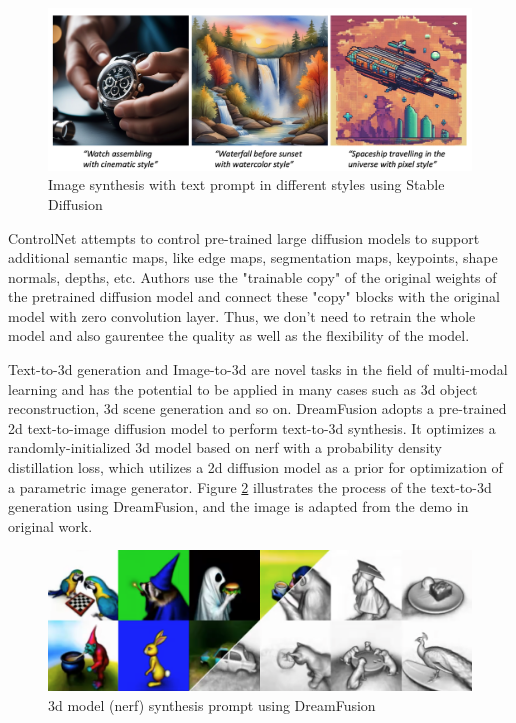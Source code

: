 \documentclass[12pt,DIV14,BCOR12mm,a4paper,footinclude=false,headinclude,parskip=half-,twoside,openright,cleardoublepage=empty,toc=index,bibliography=totoc,listof=totoc]{scrreprt}
\numberwithin{equation}{chapter}
\begin{document}
\begin{figure}[h]
	\centering
	\includegraphics[scale=0.217]{img/sd.png}
	\caption{Image synthesis with text prompt in different styles using Stable Diffusion}
	\label{img:sd}
\end{figure}

ControlNet\cite{zhang2023adding} attempts to control pre-trained large diffusion models to support additional semantic maps, like edge maps, segmentation maps, keypoints, shape normals, depths, etc. Authors use the "trainable copy" of the original weights of the pretrained diffusion model and connect these "copy" blocks with the original model with zero convolution layer. Thus, we don't need to retrain the whole model and also gaurentee the quality as well as the flexibility of the model.

Text-to-\gls{3d} generation and Image-to-\gls{3d} are novel tasks in the field of multi-modal learning and has the potential to be applied in many cases such as \gls{3d} object reconstruction, \gls{3d} scene generation and so on. DreamFusion\cite{poole2022dreamfusion} adopts a pre-trained \gls{2d} text-to-image diffusion model to perform text-to-\gls{3d} synthesis. It optimizes a randomly-initialized \gls{3d} model based on \gls{nerf} with a probability density distillation loss, which utilizes a \gls{2d} diffusion model as a prior for optimization of a parametric image generator. Figure \ref{img:df} illustrates the process of the text-to-\gls{3d} generation using DreamFusion, and the image is adapted from the demo in original work.

\begin{figure}[h]
	\centering
	\includegraphics[scale=0.28]{img/df.png}
	\caption{\gls{3d} model (\gls{nerf}) synthesis prompt using DreamFusion}
	\label{img:df}
\end{figure}
\end{document}
